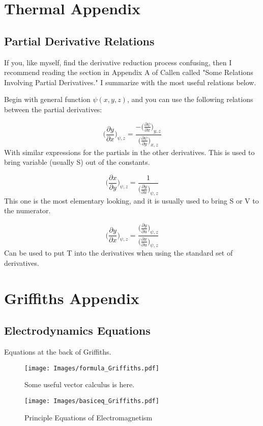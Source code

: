 
\clearpage

\appendix
\chapter{Thermal Appendix}


\section{Partial Derivative Relations}
\label{subsec::partials}

If you, like myself, find the derivative reduction process confusing, then I recommend reading the section in Appendix A of Callen called "Some Relations Involving Partial Derivatives." I summarize with the most useful relations below.

Begin with general function $\psi(x,y,z)$, and you can use the following relations between the partial derivatives:

\[
    \bigg(\frac{\partial y}{\partial x} \bigg)_{\psi,z} = \frac{-\Big(\frac{\partial \psi}{\partial x}\Big)_{y,z}} {\Big(\frac{\partial \psi}{\partial y}\Big)_{x,z}}   
\]
With similar expressions for the partials in the other derivatives. This is used to bring variable (usually S) out of the constants.

\[
    \bigg(\frac{\partial x}{\partial y} \bigg)_{\psi,z} = \frac{1} {\Big(\frac{\partial y}{\partial x}\Big)_{\psi,z}} 
\]
This one is the most elementary looking, and it is usually used to bring S or V to the numerator.

\[
    \bigg(\frac{\partial y}{\partial x} \bigg)_{\psi,z} = \frac{\Big(\frac{\partial y}{\partial u}\Big)_{\psi,z}} {\Big(\frac{\partial x}{\partial u}\Big)_{\psi,z}}
\]
Can be used to put T into the derivatives when using the standard set of derivatives.


\chapter{Griffiths Appendix}

\section{Electrodynamics Equations}
Equations at the back of Griffiths.
\begin{figure}[!hbtp]
    \centering
    \texttt{[image: Images/formula\_Griffiths.pdf]}
    \caption{Some useful vector calculus is here.}
    \label{fig:veccal}
\end{figure}

\begin{figure}[!hbtp]
    \centering
    \texttt{[image: Images/basiceq\_Griffiths.pdf]}
    \caption{Principle Equations of Electromagnetism}
    \label{fig:backpage}
\end{figure}